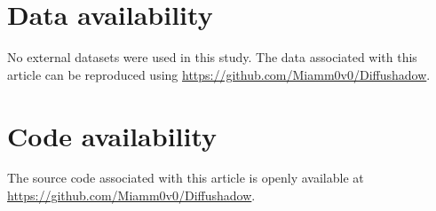 \documentclass[pdflatex,sn-nature]{sn-jnl}%
\theoremstyle{thmstyleone}%
\theoremstyle{thmstyletwo}%
\theoremstyle{thmstylethree}%
\begin{document}






\backmatter


\section*{Data availability}
No external datasets were used in this study. The data associated with this article can be reproduced using \url{https://github.com/Miamm0v0/Diffushadow}.

\section*{Code availability}
The source code associated with this article is openly available at \url{https://github.com/Miamm0v0/Diffushadow}.
\end{document}
